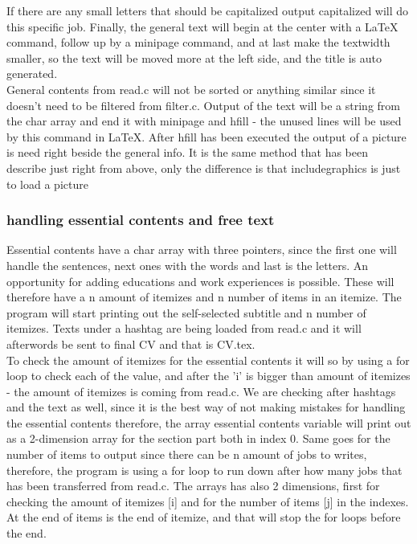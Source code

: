 If there are any small letters that should be capitalized output capitalized will do this specific job.
Finally, the general text will begin at the center with a LaTeX command, follow up by a minipage command, 
and at last make the textwidth smaller, so the text will be moved more at the left side, and the title is auto generated. \\

General contents from read.c will not be sorted or anything similar 
since it doesn't need to be filtered from filter.c.
Output of the text will be a string from the char array and end it with minipage and hfill - the unused lines will be used by this command in LaTeX.
After hfill has been executed the output of a picture is need right beside the general info.
It is the same method that has been describe just right from above, only the difference is that includegraphics is just to load a picture 

\subsubsection{handling essential contents and free text}
Essential contents have a char array with three pointers, since the first one will handle the sentences,
next ones with the words and last is the letters. An opportunity for adding educations and work experiences is possible.
These will therefore have a n amount of itemizes and n number of items in an itemize.
The program will start printing out the self-selected subtitle and n number of itemizes.
Texts under a hashtag are being loaded from read.c and it will afterwords be sent to final CV and that is CV.tex.\\
 
To check the amount of itemizes for the essential contents it will so by using a for loop to check each of the value,
and after the 'i' is bigger than amount of itemizes - the amount of itemizes is coming from read.c.
We are checking after hashtags and the text as well, since it is the best way of not making mistakes for handling the essential contents
therefore, the array essential contents variable will print out as a 2-dimension array for the section part both in index 0.
Same goes for the number of items to output since there can be n amount of jobs to writes, 
therefore, the program is using a for loop to run down after how many jobs that has been transferred from read.c.
The arrays has also 2 dimensions, first for checking the amount of itemizes [i] and for the number of items [j] in the indexes.
At the end of items is the end of itemize, and that will stop the for loops before the end. \\

